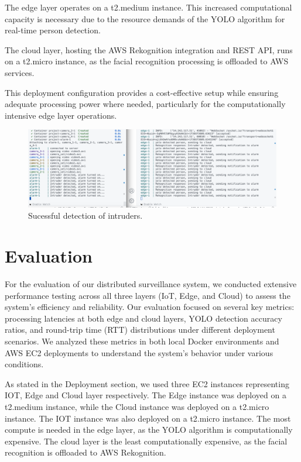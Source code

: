 \documentclass[conference]{IEEEtran}
\begin{document}
The edge layer operates on a t2.medium instance. This increased computational capacity is necessary due to the resource demands of the YOLO algorithm for real-time person detection.

The cloud layer, hosting the AWS Rekognition integration and REST API, runs on a t2.micro instance, as the facial recognition processing is offloaded to AWS services.

This deployment configuration provides a cost-effective setup while ensuring adequate processing power where needed, particularly for the computationally intensive edge layer operations.

\begin{figure}[h!]
    \centering
    \includegraphics[width=1\linewidth]{res/deployment2.png}
    \caption{Sucessful detection of intruders.}
    \label{fig:deployment}
\end{figure}
\section{Evaluation}
For the evaluation of our distributed surveillance system, we conducted extensive performance testing across all three layers (IoT, Edge, and Cloud) to assess the system's efficiency and reliability. Our evaluation focused on several key metrics: processing latencies at both edge and cloud layers, YOLO detection accuracy ratios, and round-trip time (RTT) distributions under different deployment scenarios. We analyzed these metrics in both local Docker environments and AWS EC2 deployments to understand the system's behavior under various conditions. 

As stated in the Deployment section, we used three EC2 instances representing IOT, Edge and Cloud layer respectively.  The Edge instance was deployed on a t2.medium instance, while the Cloud instance was deployed on a t2.micro instance. The IOT instance was also deployed on a t2.micro instance. 
The most compute is needed in the edge layer, as the YOLO algorithm is computationally expensive. The cloud layer is the least computationally expensive, as the facial recognition is offloaded to AWS Rekognition. 
\end{document}
